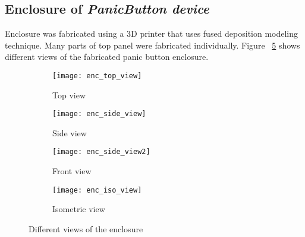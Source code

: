\subsection{Enclosure of \emph{PanicButton device}}
Enclosure was fabricated using a 3D printer that uses fused deposition modeling technique. Many parts of top panel were fabricated individually. Figure ~\ref{fig:enc_views} shows different views of the fabricated panic button enclosure. 

\begin{figure}
\begin{subfigure}{.5\textwidth}
  \centering
  \texttt{[image: enc\_top\_view]}
  \caption{Top view}
  \label{fig:enc_top_view}
\end{subfigure}%
\begin{subfigure}{.5\textwidth}
  \centering
  \texttt{[image: enc\_side\_view]}
  \caption{Side view}
  \label{fig:enc_side_view}
\end{subfigure}
\begin{subfigure}{.5\textwidth}
  \centering
  \texttt{[image: enc\_side\_view2]}
  \caption{Front view}
  \label{fig:enc_side_view2}
\end{subfigure}%
\begin{subfigure}{.5\textwidth}
  \centering
  \texttt{[image: enc\_iso\_view]}
  \caption{Isometric view}
  \label{fig:enc_iso_view}
\end{subfigure}
\caption{Different views of the enclosure}
\label{fig:enc_views}
\end{figure}



